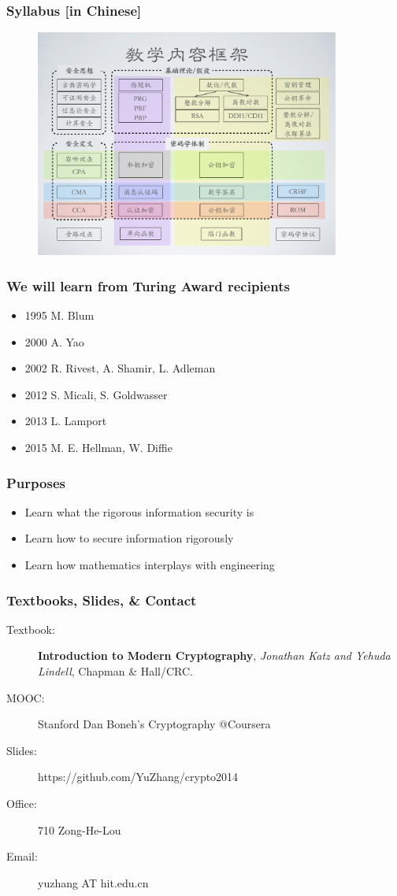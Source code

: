 \begin{frame}\frametitle{Syllabus [in Chinese]}
\begin{figure}
\begin{center}
\includegraphics[width=100mm]{pic/syllabus} 
\end{center}
\end{figure}
\end{frame}
\begin{frame}\frametitle{We will learn from Turing Award recipients}
\begin{itemize}
\item{1995} M. Blum
\item{2000} A. Yao
\item{2002} R. Rivest, A. Shamir, L. Adleman
\item{2012} S. Micali, S. Goldwasser
\item{2013} L. Lamport
\item{2015} M. E. Hellman, W. Diffie
\end{itemize}	
\end{frame}
\begin{frame}\frametitle{Purposes}
\begin{itemize}
\item Learn what the rigorous information security is
\item Learn how to secure information rigorously
\item Learn how mathematics interplays with engineering
\end{itemize}
\end{frame}
\begin{frame}\frametitle{Textbooks, Slides, \& Contact}
\begin{description} 
\item[Textbook:] \textbf{Introduction to Modern Cryptography}, \emph{Jonathan Katz and Yehuda Lindell}, Chapman \& Hall/CRC.
\item[MOOC:] Stanford Dan Boneh's Cryptography @Coursera
\item[Slides:] https://github.com/YuZhang/crypto2014
\item[Office:] 710 Zong-He-Lou
\item[Email:] yuzhang AT hit.edu.cn
\end{description}
\end{frame}
